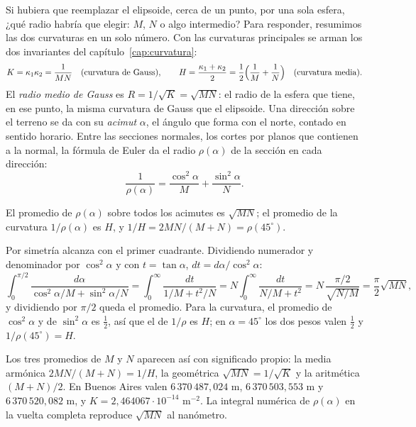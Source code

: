 Si hubiera que reemplazar el elipsoide, cerca de un punto, por una sola esfera, ¿qué radio
habría que elegir: \(M\), \(N\) o algo intermedio? Para responder, resumimos las dos
curvaturas en un solo número.
Con las curvaturas principales se arman los dos invariantes del capítulo~\ref{cap:curvatura}:
\[
  K=\kappa_1\kappa_2=\frac1{MN}\quad\text{(curvatura de Gauss)},\qquad
  H=\frac{\kappa_1+\kappa_2}2=\frac12\Bigl(\frac1M+\frac1N\Bigr)\quad\text{(curvatura media)} .
\]
El \emph{radio medio de Gauss} es \(R=1/\sqrt K=\sqrt{MN}\): el radio de la esfera que tiene,
en ese punto, la misma curvatura de Gauss que el elipsoide. Una dirección sobre el terreno se
da con su \emph{acimut} \(\alpha\), el ángulo que forma con el norte, contado en sentido
horario. Entre las secciones normales, los cortes por planos que contienen a la normal, la
fórmula de Euler da el radio \(\rho(\alpha)\) de la sección en cada dirección:
\[
  \frac1{\rho(\alpha)}=\frac{\cos^2\alpha}M+\frac{\sin^2\alpha}N .
\]

\begin{proposicion}\label{prop:elip-media}
El promedio de \(\rho(\alpha)\) sobre todos los acimutes es \(\sqrt{MN}\); el promedio de la
curvatura \(1/\rho(\alpha)\) es \(H\), y \(1/H=2MN/(M+N)=\rho(45^\circ)\).
\end{proposicion}

\begin{demostracion}
Por simetría alcanza con el primer cuadrante. Dividiendo numerador y denominador por
\(\cos^2\alpha\) y con \(t=\tan\alpha\), \(dt=d\alpha/\cos^2\alpha\):
\[
  \int_0^{\pi/2}\frac{d\alpha}{\cos^2\alpha/M+\sin^2\alpha/N}
  =\int_0^\infty\frac{dt}{1/M+t^2/N}
  =N\int_0^\infty\frac{dt}{N/M+t^2}
  =N\,\frac{\pi/2}{\sqrt{N/M}}=\frac\pi2\sqrt{MN},
\]
y dividiendo por \(\pi/2\) queda el promedio. Para la curvatura, el promedio de
\(\cos^2\alpha\) y de \(\sin^2\alpha\) es \(\tfrac12\), así que el de \(1/\rho\) es \(H\); en
\(\alpha=45^\circ\) los dos pesos valen \(\tfrac12\) y \(1/\rho(45^\circ)=H\).
\end{demostracion}

Los tres promedios de \(M\) y \(N\) aparecen así con significado propio: la media armónica
\(2MN/(M+N)=1/H\), la geométrica \(\sqrt{MN}=1/\sqrt K\) y la aritmética \((M+N)/2\). En
Buenos Aires valen \(6\,370\,487{,}024\) m, \(6\,370\,503{,}553\) m y \(6\,370\,520{,}082\) m, y
\(K=2{,}464067\cdot10^{-14}\) m\(^{-2}\). La integral numérica de \(\rho(\alpha)\) en la vuelta
completa reproduce \(\sqrt{MN}\) al nanómetro.

